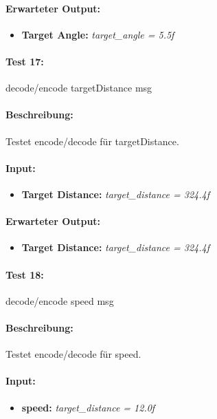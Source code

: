 \documentclass[a4paper, 12pt, titlepage]{scrartcl}
\begin{document}
{			\paragraph{Erwarteter Output:}
			\begin{itemize} \itemsep-0.5em
				\item \textbf{Target Angle:} \emph{target\_angle = 5.5f}
			\end{itemize}

			\paragraph{Test 17:}{decode/encode targetDistance msg}
			\paragraph{Beschreibung:} Testet encode/decode für targetDistance.
			\paragraph{Input:}
			\begin{itemize} \itemsep-0.5em
				\item \textbf{Target Distance:} \emph{target\_distance = 324.4f}
			\end{itemize}
			\paragraph{Erwarteter Output:}
			\begin{itemize} \itemsep-0.5em
				\item \textbf{Target Distance:} \emph{target\_distance = 324.4f}
			\end{itemize}

			\paragraph{Test 18:}{decode/encode speed msg}
			\paragraph{Beschreibung:} Testet encode/decode für speed.
			\paragraph{Input:}
			\begin{itemize} \itemsep-0.5em
				\item \textbf{speed:} \emph{target\_distance = 12.0f}
			\end{itemize}
}
\end{document}
